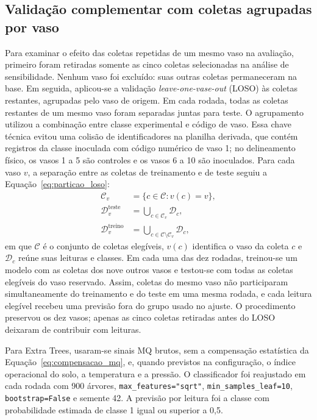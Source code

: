 \subsection{Validação complementar com coletas agrupadas por vaso}
\label{subsec:loso_complementar}

Para examinar o efeito das coletas repetidas de um mesmo vaso na avaliação,
primeiro foram retiradas somente as cinco coletas selecionadas na análise
de sensibilidade. Nenhum vaso foi excluído: suas outras coletas
permaneceram na base. Em seguida, aplicou-se a validação
\textit{leave-one-vase-out} (LOSO) às coletas restantes, agrupadas pelo
vaso de origem. Em cada rodada, todas as coletas restantes de um mesmo
vaso foram separadas juntas para teste. O agrupamento utilizou a
combinação entre
classe experimental e código de vaso. Essa chave técnica evitou uma colisão
de identificadores na
planilha derivada, que contém registros da classe inoculada com código
numérico de vaso 1; no delineamento físico, os vasos 1 a 5 são controles
e os vasos 6 a 10 são inoculados. Para cada vaso $v$, a separação entre
as coletas de treinamento e de teste seguiu a
Equação~\eqref{eq:particao_loso}:
\begin{equation}
    \begin{aligned}
        \mathcal{C}_v
        &=\{c\in\mathcal{C}:v(c)=v\},\\
        \mathcal{D}^{\mathrm{teste}}_v
        &=\bigcup_{c\in\mathcal{C}_v}\mathcal{D}_c,\\
        \mathcal{D}^{\mathrm{treino}}_v
        &=\bigcup_{c\in\mathcal{C}\setminus\mathcal{C}_v}\mathcal{D}_c,
    \end{aligned}
    \label{eq:particao_loso}
\end{equation}
em que $\mathcal{C}$ é o conjunto de coletas elegíveis, $v(c)$ identifica
o vaso da coleta $c$ e $\mathcal{D}_c$ reúne suas leituras e classes.
Em cada uma das dez rodadas, treinou-se um modelo com as coletas dos
nove outros vasos e testou-se com todas as coletas elegíveis do vaso
reservado. Assim, coletas do mesmo vaso não participaram simultaneamente
do treinamento e do teste em uma mesma rodada, e cada leitura elegível
recebeu uma previsão fora do grupo usado no ajuste. O procedimento
preservou os dez vasos; apenas as cinco coletas retiradas antes do LOSO
deixaram de contribuir com leituras.

Para Extra Trees, usaram-se sinais MQ brutos, sem a compensação estatística
da Equação~\eqref{eq:compensacao_mq}, e, quando previstos na configuração,
o índice operacional do solo, a temperatura e a pressão. O classificador
foi reajustado em cada rodada com 900 árvores,
\texttt{max\_features="sqrt"}, \texttt{min\_samples\_leaf=10},
\texttt{bootstrap=False} e semente 42. A previsão por leitura foi a classe
com probabilidade estimada de classe 1 igual ou superior a 0,5.

